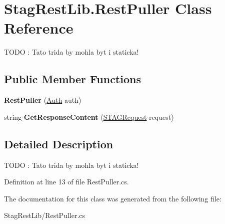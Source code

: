 \hypertarget{class_stag_rest_lib_1_1_rest_puller}{}\section{Stag\+Rest\+Lib.\+Rest\+Puller Class Reference}
\label{class_stag_rest_lib_1_1_rest_puller}


T\+O\+DO \+: Tato trida by mohla byt i staticka!  


\subsection*{Public Member Functions}
\begin{DoxyCompactItemize}
\item 
\mbox{\label{class_stag_rest_lib_1_1_rest_puller_abbbfb037e600764abffdea8395f98270}} 
{\bfseries Rest\+Puller} (\hyperlink{class_stag_rest_lib_1_1_auth}{Auth} auth)
\item 
\mbox{\label{class_stag_rest_lib_1_1_rest_puller_a69c3425cf454a69bc34de444f4c050ca}} 
string {\bfseries Get\+Response\+Content} (\hyperlink{class_stag_rest_lib_1_1_s_t_a_g_request}{S\+T\+A\+G\+Request} request)
\end{DoxyCompactItemize}


\subsection{Detailed Description}
T\+O\+DO \+: Tato trida by mohla byt i staticka! 



Definition at line 13 of file Rest\+Puller.\+cs.



The documentation for this class was generated from the following file\+:\begin{DoxyCompactItemize}
\item 
Stag\+Rest\+Lib/Rest\+Puller.\+cs\end{DoxyCompactItemize}

